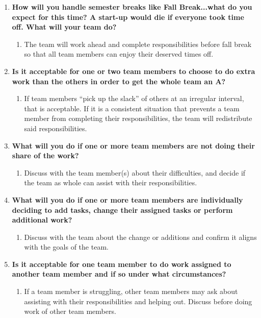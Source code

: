 \documentclass[12pt]{article}
\begin{document}
\begin{enumerate}
    \item \textbf{How will you handle semester breaks like Fall Break...what do you expect for this time? A start-up would die if everyone took time off. What will your team do?}
    \begin{enumerate}
        \item The team will work ahead and complete responsibilities before fall break so that all team members can enjoy their deserved times off.
    \end{enumerate}

    \item \textbf{Is it acceptable for one or two team members to choose to do extra work than the others in order to get the whole team an A?}
    \begin{enumerate}
        \item If team members ``pick up the slack'' of others at an irregular interval, that is acceptable. If it is a consistent situation that prevents a team member from completing their responsibilities, the team will redistribute said responsibilities.
    \end{enumerate}

    \item \textbf{What will you do if one or more team members are not doing their share of the work?}
    \begin{enumerate}
        \item Discuss with the team member(s) about their difficulties, and decide if the team as whole can assist with their responsibilities.
    \end{enumerate}

    \item \textbf{What will you do if one or more team members are individually deciding to add tasks, change their assigned tasks or perform additional work?}
    \begin{enumerate}
        \item Discuss with the team about the change or additions and confirm it aligns with the goals of the team.
    \end{enumerate}

    \item \textbf{Is it acceptable for one team member to do work assigned to another team member and if so under what circumstances?}
    \begin{enumerate}
        \item If a team member is struggling, other team members may ask about assisting with their responsibilities and helping out. Discuss before doing work of other team members.
    \end{enumerate}


\end{enumerate}
\end{document}
